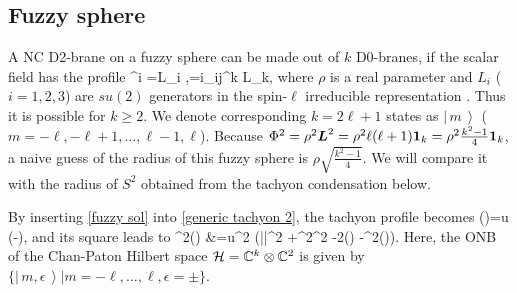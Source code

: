 \documentclass[12pt]{article}
\numberwithin{equation}{section}
\newcommand{\Ket}[1]{\left|\, #1\,\right\rangle}
\def\complex{\mathbb{C}}
\def\bea#1\ena{\begin{align}#1\end{align}}
\begin{document}
\subsection{Fuzzy sphere}

A NC D2-brane on a fuzzy sphere can be made out of $k$ D0-branes, 
if the scalar field has the profile
\bea
\Phi^i =\rho L_i ,\qquad [L_i,L_j]=i{\varepsilon_{ij}}^k L_k, 
\label{fuzzy sol}
\ena
where $\rho$ is a real parameter and $L_i$ ($i=1,2,3$) are $su(2)$ generators 
in {the} spin-$\ell$ irreducible representation {\cite{Madore1992}}.
Thus it is possible for $k\ge 2$.
We denote corresponding $k=2\ell +1$ states as 
$\Ket{m}$ ($m=-\ell, -\ell+1,\ldots, \ell-1, \ell$).
Because 
$\Phi^2=\rho^2 \boldsymbol{L}^2=\rho^2 \ell(\ell +1) {\bf 1}_k 
=\rho^2 \frac{k^2 -1}{4} {\bf 1}_k$,
a naive guess of the radius of this fuzzy sphere is $\rho \sqrt{\frac{k^2 -1}{4}}$.
We will compare it with the radius of $S^2$ obtained from the tachyon condensation below.

By inserting \eqref{fuzzy sol} into \eqref{generic tachyon 2}, 
the tachyon profile becomes
\bea
T()=u \boldsymbol{\sigma} \cdot (-\rho {}),
\label{S2 tachyon}
\ena
and its square leads to
\bea
T^2()
&=u^2 \left(||^2 +\rho^2^2 -2\rho(\cdot {}) -\rho^2(\boldsymbol{\sigma}\cdot {})\right). 
\ena
Here, the ONB of the Chan-Paton Hilbert space 
${\cal H}=\complex^k \otimes \complex^2$ is given by 
$\{\Ket{m,\epsilon}| m=-\ell,\ldots, \ell, \epsilon=\pm\}$.

\end{document}
